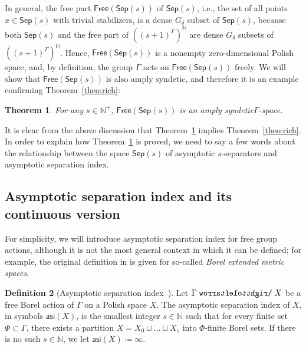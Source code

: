 \documentclass[11pt,reqno,psamsfonts]{amsart}
\theoremstyle{bfnote}
\newtheorem{theo}{Theorem}[section]
\theoremstyle{definition}
\newtheorem{defn}[theo]{Definition}
\theoremstyle{remark}
\newcommand{\0}{\varnothing}
\newcommand{\defeq}{\coloneqq}
\newcommand{\emphd}[1]{{\fontseries{b}\selectfont\textsf{#1}}}
\newcommand{\acts}{\mathrel{\reflectbox{$\righttoleftarrow$}}}
\newcommand{\G}{\Gamma}
\newcommand{\Free}{\mathsf{Free}}
\newcommand{\N}{\mathbb{N}}
\newcommand{\asi}{\mathsf{asi}}
\newcommand{\sr}{amply syndetic\xspace}
\newcommand{\Sep}{\mathsf{Sep}}
\numberwithin{equation}{section}
\begin{document}
    In general, the {free part} $\Free(\Sep(s))$ of $\Sep(s)$, i.e., the set of all points $x \in \Sep(s)$ with trivial stabilizers, is a dense $G_\delta$ subset of $\Sep(s)$, because both $\Sep(s)$ and the free part of $((s+1)^\G)^\N$ are dense $G_\delta$ subsets of $((s+1)^\G)^\N$. Hence, $\Free(\Sep(s))$ is a nonempty zero-dimensional Polish space, and, by definition, the group $\G$ acts on $\Free(\Sep(s))$ freely. We will show that $\Free(\Sep(s))$ is also \sr, and therefore %
    it is an example confirming Theorem~\ref{theo:rich}:

    \begin{tcolorbox}
    \begin{theo}\label{theo:example}
        For any $s \in \N^+$, $\Free(\Sep(s))$ is an \sr $\G$-space.
    \end{theo}
    \end{tcolorbox}

    It is clear from the above discussion that Theorem~\ref{theo:example} implies Theorem~\ref{theo:rich}. In order to explain how Theorem~\ref{theo:example} is proved, we need to say a few words about the relationship between the space $\Sep(s)$ of asymptotic $s$-separators and asymptotic separation index. %

    \subsection{Asymptotic separation index and its continuous version}\label{subsubsec:asi}

    For simplicity, we will introduce asymptotic separation index for free group actions, although it is not the most general context in which it can be defined; for example, the original definition in \cite{CJMSTD} is given for so-called \emph{Borel extended metric spaces}.

    \begin{defn}[{Asymptotic separation index~\cite[Defn.~3.2]{CJMSTD}}]\label{defn:asi}
        Let $\G \acts X$ be a free Borel action of $\G$ on a Polish space $X$. The \emphd{asymptotic separation index} of $X$, in symbols $\asi(X)$, is the smallest integer $s \in \N$ such that for every finite set $\Phi \subset \G$, there exists a partition $X = X_0 \sqcup \ldots \sqcup X_s$ into $\Phi$-finite Borel sets. If there is no such $s \in \N$, we let $\asi(X) \defeq \infty$.
    \end{defn}
\end{document}
